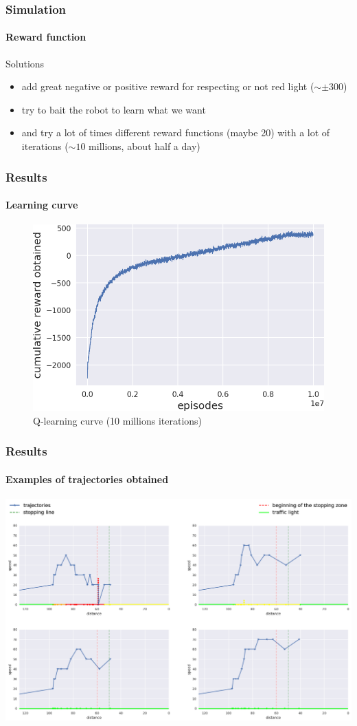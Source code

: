 \documentclass[dvipsnames,svgnames]{beamer}
\begin{document}
\begin{frame}
\frametitle{Simulation}
\framesubtitle{Reward function}
\begin{block}{Solutions}
\begin{itemize}
\item  add great negative or positive reward for respecting or not red light ($\sim \pm 300$)
\item \pause try to bait the robot to learn what we want
\item \pause and try a lot of times different reward functions (maybe 20) with a lot of iterations ($\sim 10$ millions, about half a day)
\end{itemize}
\end{block}
\end{frame}


\begin{frame}
\frametitle{Results}
 \framesubtitle{Learning curve}
 \begin{figure}
 \centering
\includegraphics[scale=0.5]{img/Q-learning-curve.png}
\caption{Q-learning curve (10 millions iterations)}
\end{figure}
\end{frame}

\begin{frame}
\frametitle{Results}
 \framesubtitle{Examples of trajectories obtained}
  \centering
\includegraphics[scale=0.3]{img/new_legend_traj.png}
 \end{frame}
 
\end{document}
